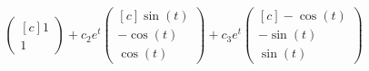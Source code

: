 \documentclass[11pt, titlepage]{article}
\begin{document}
\begin{solution}
\begin{equation*}
\begin{pmatrix*}[c]
        1 \\
        1
      \end{pmatrix*} +
      c_{2} e^{t}
      \begin{pmatrix*}[c]
        \sin(t) \\
        -\cos(t) \\
        \cos(t)
      \end{pmatrix*} +
      c_{3} e^{t}
      \begin{pmatrix*}[c]
        -\cos(t) \\
        -\sin(t) \\
        \sin(t)
      \end{pmatrix*}
    \end{equation*}
  \end{solution}
\end{document}
